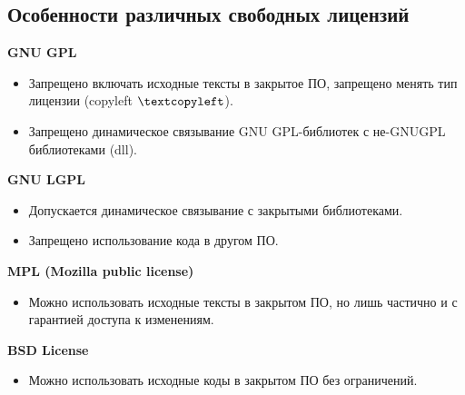 \subsection{Особенности различных свободных лицензий}
\begin{center}
  \textbf{GNU GPL}
\end{center}
\begin{itemize}
  \item Запрещено включать исходные тексты в закрытое ПО, запрещено менять тип лицензии (copyleft $\textcopyleft$).
  \item Запрещено динамическое связывание GNU GPL-библиотек с не-GNUGPL библиотеками (dll).
\end{itemize}
\begin{center}
  \textbf{GNU LGPL}
\end{center}
\begin{itemize}
  \item Допускается динамическое связывание с закрытыми библиотеками.
  \item Запрещено использование кода в другом ПО.
\end{itemize}
\begin{center}
  \textbf{MPL (Mozilla public license)}
\end{center}
\begin{itemize}
  \item Можно использовать исходные тексты в закрытом ПО, но
лишь частично и с гарантией доступа к изменениям.
\end{itemize}
\begin{center}
  \textbf{BSD License}
\end{center}
\begin{itemize}
  \item Можно использовать исходные коды в закрытом ПО без ограничений.
\end{itemize}
